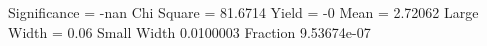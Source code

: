 Significance = -nan
Chi Square = 81.6714
Yield = -0
Mean = 2.72062
Large Width = 0.06
Small Width 0.0100003
Fraction 9.53674e-07
